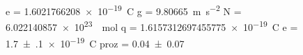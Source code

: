 e = \SI[]{1.6021766208e-19}{\coulomb}
g = \SI[]{9.80665}{\meter\per\second\squared}
N = \SI[]{6.022140857e+23}{\per\mole}
q = \SI[]{1.6157312697455775e-19}{\coulomb}
e = \SI{+1.7(1)e-19}{\coulomb}
proz = \SI{+0.04(7)}{}
